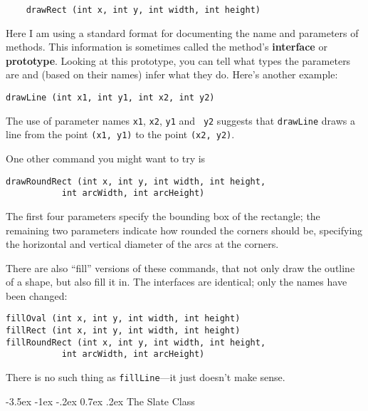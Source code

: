 \documentclass{book}
\makeatletter
\renewcommand{\section}{\@startsection 
    {section} {1} {0mm}%
    {-3.5ex \@plus -1ex \@minus -.2ex}%
    {0.7ex \@plus.2ex}%
    {\normalfont\Large\bfseries}}
\makeatother
\begin{document}
\begin{verbatim}
    drawRect (int x, int y, int width, int height)
\end{verbatim}
%
Here I am using a standard format for documenting the name
and parameters of methods.  This information is sometimes
called the method's {\bf interface} or {\bf prototype}.
Looking at this prototype, you can tell what types the
parameters are and (based on their names) infer what they
do.  Here's another example:

\begin{verbatim}
drawLine (int x1, int y1, int x2, int y2)
\end{verbatim}
%
The use of parameter names {\tt x1}, {\tt x2}, {\tt y1} and {\tt
y2} suggests that {\tt drawLine} draws a line from the
point {\tt (x1, y1)} to the point {\tt (x2, y2)}.

One other command you might want to try is

\begin{verbatim}
drawRoundRect (int x, int y, int width, int height,
	       int arcWidth, int arcHeight)
\end{verbatim}
%
The first four parameters specify the bounding box of
the rectangle; the remaining two parameters indicate
how rounded the corners should be, specifying the
horizontal and vertical diameter of the arcs at the
corners.

There are also ``fill'' versions of these commands, that not
only draw the outline of a shape, but also fill it in.
The interfaces are identical; only the names have been
changed:

\begin{verbatim}
fillOval (int x, int y, int width, int height)
fillRect (int x, int y, int width, int height)
fillRoundRect (int x, int y, int width, int height,
	       int arcWidth, int arcHeight)
\end{verbatim}
%
There is no such thing as {\tt fillLine}---it just doesn't
make sense.


\section{The Slate Class}
\label{slate}
\end{document}

